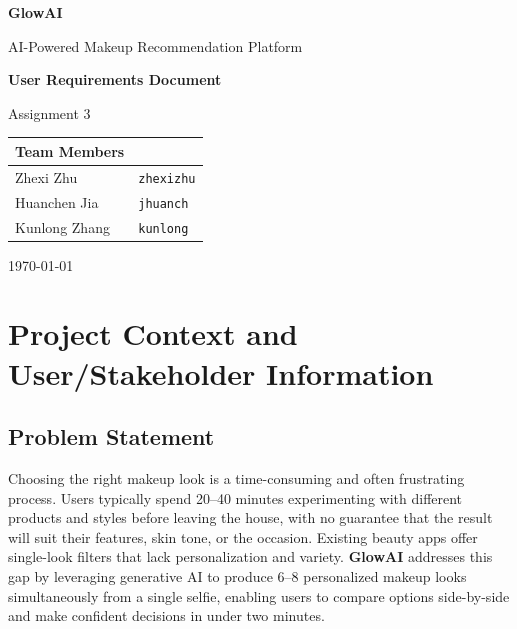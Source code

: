 \documentclass[11pt, letterpaper]{article}
\begin{document}
\begin{titlepage}
    \centering
    \vspace*{2cm}
    {\Huge\bfseries GlowAI\par}
    \vspace{0.5cm}
    {\Large AI-Powered Makeup Recommendation Platform\par}
    \vspace{1.5cm}
    {\LARGE\bfseries User Requirements Document\par}
    \vspace{0.5cm}
    {\large Assignment 3\par}
    \vspace{2cm}

    \begin{tabular}{l l}
        \textbf{Team Members} & \\
        \midrule
        Zhexi Zhu & \texttt{zhexizhu} \\
        Huanchen Jia & \texttt{jhuanch} \\
        Kunlong Zhang & \texttt{kunlong} \\
    \end{tabular}

    \vspace{2cm}
    {\large \today\par}
    \vfill
\end{titlepage}

\tableofcontents
\newpage

\section{Project Context and User/Stakeholder Information}

\subsection{Problem Statement}
Choosing the right makeup look is a time-consuming and often frustrating process. Users typically spend 20--40 minutes experimenting with different products and styles before leaving the house, with no guarantee that the result will suit their features, skin tone, or the occasion. Existing beauty apps offer single-look filters that lack personalization and variety. \textbf{GlowAI} addresses this gap by leveraging generative AI to produce 6--8 personalized makeup looks simultaneously from a single selfie, enabling users to compare options side-by-side and make confident decisions in under two minutes.
\end{document}
